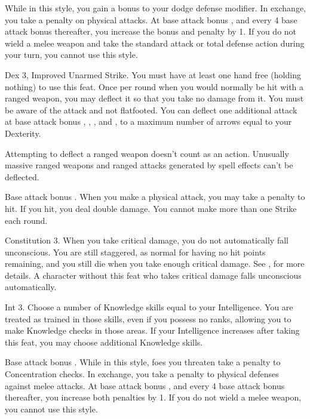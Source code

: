  While in this style, you gain a  bonus to your dodge defense modifier. In exchange, you take a  penalty on physical attacks. At base attack bonus , and every 4 base attack bonus thereafter, you increase the bonus and penalty by 1. If you do not wield a melee weapon and take the standard attack or total defense action during your turn, you cannot use this style.

 Dex 3, Improved Unarmed Strike.
 You must have at least one hand free (holding nothing) to use this feat. Once per round when you would normally be hit with a ranged weapon, you may deflect it so that you take no damage from it. You must be aware of the attack and not flatfooted. You can deflect one additional attack at base attack bonus , , , and , to a maximum number of arrows equal to your Dexterity.
\par Attempting to deflect a ranged weapon doesn't count as an action. Unusually massive ranged weapons and ranged attacks generated by spell effects can't be deflected.

\featpre Base attack bonus .
\featben When you make a physical attack, you may take a  penalty to hit. If you hit, you deal double damage. You cannot make more than one Strike each round.

 Constitution 3.
 When you take critical damage, you do not automatically fall unconscious. You are still staggered, as normal for having no hit points remaining, and you still die when you take enough critical damage. See , for more details.
 A character without this feat who takes critical damage falls unconscious automatically.

 Int 3.
 Choose a number of Knowledge skills equal to your Intelligence. You are treated as trained in those skills, even if you possess no ranks, allowing you to make Knowledge checks in those areas. If your Intelligence increases after taking this feat, you may choose additional Knowledge skills.

 Base attack bonus .
 While in this style, foes you threaten take a  penalty to Concentration checks. In exchange, you take a  penalty to physical defenses against melee attacks. At base attack bonus , and every 4 base attack bonus thereafter, you increase both penalties by 1. If you do not wield a melee weapon, you cannot use this style.

